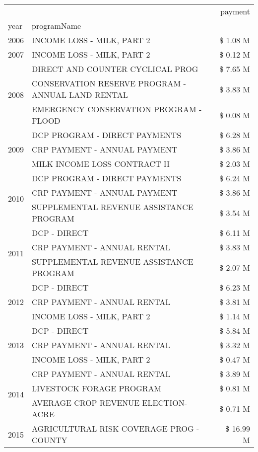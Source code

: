 \begin{tabular}{llr}
\toprule
 &  & payment \\
year & programName &  \\
\midrule
2006 & INCOME LOSS - MILK, PART 2 & \$ 1.08 M \\
\cline{1-3}
2007 & INCOME LOSS - MILK, PART 2 & \$ 0.12 M \\
\cline{1-3}
\multirow[t]{3}{*}{2008} & DIRECT AND COUNTER CYCLICAL PROG & \$ 7.65 M \\
 & CONSERVATION RESERVE PROGRAM - ANNUAL LAND RENTAL & \$ 3.83 M \\
 & EMERGENCY CONSERVATION PROGRAM - FLOOD & \$ 0.08 M \\
\cline{1-3}
\multirow[t]{3}{*}{2009} & DCP PROGRAM - DIRECT PAYMENTS & \$ 6.28 M \\
 & CRP PAYMENT - ANNUAL PAYMENT & \$ 3.86 M \\
 & MILK INCOME LOSS CONTRACT II & \$ 2.03 M \\
\cline{1-3}
\multirow[t]{3}{*}{2010} & DCP PROGRAM - DIRECT PAYMENTS & \$ 6.24 M \\
 & CRP PAYMENT - ANNUAL PAYMENT & \$ 3.86 M \\
 & SUPPLEMENTAL REVENUE ASSISTANCE PROGRAM & \$ 3.54 M \\
\cline{1-3}
\multirow[t]{3}{*}{2011} & DCP - DIRECT & \$ 6.11 M \\
 & CRP PAYMENT - ANNUAL RENTAL & \$ 3.83 M \\
 & SUPPLEMENTAL REVENUE ASSISTANCE PROGRAM & \$ 2.07 M \\
\cline{1-3}
\multirow[t]{3}{*}{2012} & DCP - DIRECT & \$ 6.23 M \\
 & CRP PAYMENT - ANNUAL RENTAL & \$ 3.81 M \\
 & INCOME LOSS - MILK, PART 2 & \$ 1.14 M \\
\cline{1-3}
\multirow[t]{3}{*}{2013} & DCP - DIRECT & \$ 5.84 M \\
 & CRP PAYMENT - ANNUAL RENTAL & \$ 3.32 M \\
 & INCOME LOSS - MILK, PART 2 & \$ 0.47 M \\
\cline{1-3}
\multirow[t]{3}{*}{2014} & CRP PAYMENT - ANNUAL RENTAL & \$ 3.89 M \\
 & LIVESTOCK FORAGE PROGRAM & \$ 0.81 M \\
 & AVERAGE CROP REVENUE ELECTION-ACRE & \$ 0.71 M \\
\cline{1-3}
\multirow[t]{3}{*}{2015} & AGRICULTURAL RISK COVERAGE PROG - COUNTY & \$ 16.99 M \\

\end{tabular}
